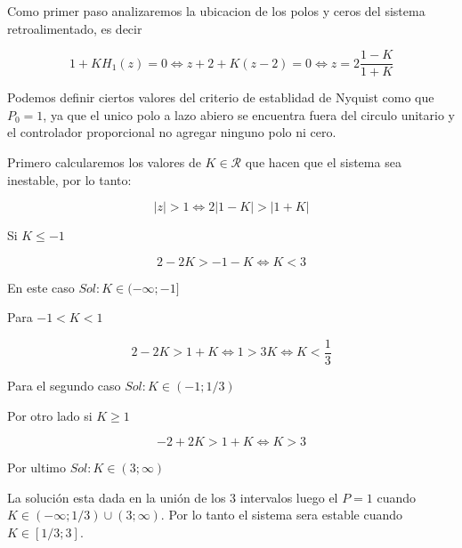 \documentclass{article}
\begin{document}
            Como primer paso analizaremos la ubicacion de los polos y ceros del sistema retroalimentado, es decir 

            \begin{equation}
                \label{eq:ej8-a}
                1 + KH_1(z) = 0 \Leftrightarrow z+2 + K(z-2) = 0 \Leftrightarrow z = 2 \frac{1 - K}{1 + K} 
            \end{equation}

            Podemos definir ciertos valores del criterio de establidad de Nyquist como que $P_0=1$, ya que el unico polo a lazo abiero se encuentra fuera del circulo unitario 
            y el controlador proporcional no agregar ninguno polo ni cero. 

            Primero calcularemos los valores de $K\in \mathcal{R}$ que hacen que el sistema sea inestable, por lo tanto:

            \begin{equation}
                |z| > 1 \Leftrightarrow
                2|1-K| > |1+K| 
            \end{equation}

            Si $K\leq-1$

            \begin{equation}
                2 - 2K > -1 - K \Leftrightarrow
                K < 3
            \end{equation}

            En este caso $Sol: K \in (-\infty;-1]$

            Para $-1<K<1$

            \begin{equation}
                2- 2K > 1+K  \Leftrightarrow
                1 > 3K \Leftrightarrow
                K < \frac{1}{3} 
            \end{equation}

            Para el segundo caso $Sol: K \in (-1; 1/3)$

            Por otro lado si $K\geq1$

            \begin{equation}
                -2 + 2K > 1 + K \Leftrightarrow
                K > 3
            \end{equation}

            Por ultimo $Sol: K \in ( 3; \infty )$

            La solución esta dada en la unión de los 3 intervalos luego el $P=1$ cuando $K \in (-\infty;1/3) \cup (3;\infty)$. Por lo tanto 
            el sistema sera estable cuando $K\in [ 1/3; 3 ]$.
\end{document}
